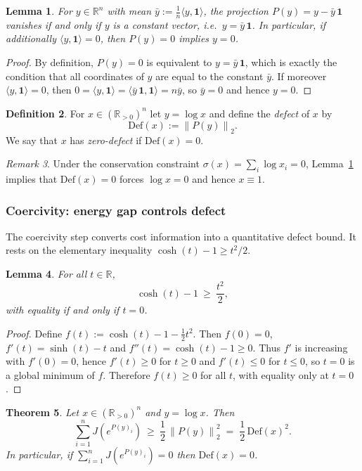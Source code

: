 \documentclass[11pt,reqno]{amsart}
\newtheorem{theorem}{Theorem}[section]
\newtheorem{lemma}[theorem]{Lemma}
\theoremstyle{definition}
\newtheorem{definition}[theorem]{Definition}
\theoremstyle{remark}
\newtheorem{remark}[theorem]{Remark} %
\newcommand{\R}{\mathbb{R}}
\newcommand{\Rp}{\mathbb{R}_{>0}}
\newcommand{\1}{\mathbf{1}}
\newcommand{\norm}[1]{\left\lVert #1 \right\rVert}
\begin{document}
\begin{lemma}\label{lem:Pkernel}
For $y\in\R^n$ with mean $\bar y:=\frac1n\langle y,\mathbf 1\rangle$, the projection $P(y)=y-\bar y\,\mathbf 1$
vanishes if and only if $y$ is a constant vector, i.e.\ $y=\bar y\,\mathbf 1$.
In particular, if additionally $\langle y,\mathbf 1\rangle=0$, then $P(y)=0$ implies $y=0$.
\end{lemma}

\begin{proof}
By definition, $P(y)=0$ is equivalent to $y=\bar y\,\mathbf 1$, which is exactly the condition that all coordinates
of $y$ are equal to the constant $\bar y$.
If moreover $\langle y,\mathbf 1\rangle=0$, then $0=\langle y,\mathbf 1\rangle=\langle \bar y\,\mathbf 1,\mathbf 1\rangle=n\bar y$,
so $\bar y=0$ and hence $y=0$.
\end{proof}


\begin{definition}\label{def:defect}
For $x\in(\Rp)^n$ let $y=\log x$ and define the \emph{defect} of $x$ by
\[
\mathrm{Def}(x):=\norm{P(y)}_2.
\]
We say that $x$ has \emph{zero-defect} if $\mathrm{Def}(x)=0$.
\end{definition}

\begin{remark}
Under the conservation constraint $\sigma(x)=\sum_i \log x_i=0$,
Lemma~\ref{lem:Pkernel} implies that $\mathrm{Def}(x)=0$ forces $\log x=0$ and hence $x\equiv 1$.
\end{remark}

\subsubsection{Coercivity: energy gap controls defect}\label{sec:coercivity} The coercivity step converts cost information into a quantitative defect bound. It rests on the
elementary inequality $\cosh(t)-1\geq t^2/2$. \begin{lemma}\label{lem:coshcoercive}
For all $t\in\R$,
\[
\cosh(t)-1\ \geq\ \frac{t^2}{2},
\]
with equality if and only if $t=0$.
\end{lemma}

\begin{proof}
Define $f(t):=\cosh(t)-1-\tfrac12 t^2$. Then $f(0)=0$, $f'(t)=\sinh(t)-t$ and
$f''(t)=\cosh(t)-1\geq 0$. Thus $f'$ is increasing with $f'(0)=0$, hence $f'(t)\geq 0$ for $t\geq 0$
and $f'(t)\leq 0$ for $t\le 0$, so $t=0$ is a global minimum of $f$. Therefore $f(t)\geq 0$ for all $t$,
with equality only at $t=0$.
\end{proof} \begin{theorem}\label{thm:coercive}
Let $x\in(\Rp)^n$ and $y=\log x$. Then
\begin{equation}\label{eq:coercive}
\sum_{i=1}^n J\!\left(e^{P(y)_i}\right)\ \geq\ \frac12\,\norm{P(y)}_2^2 \;=\;\frac12\,\mathrm{Def}(x)^2.
\end{equation}
In particular, if $\sum_{i=1}^n J\!\left(e^{P(y)_i}\right)=0$ then $\mathrm{Def}(x)=0$.
\end{theorem}
\end{document}
